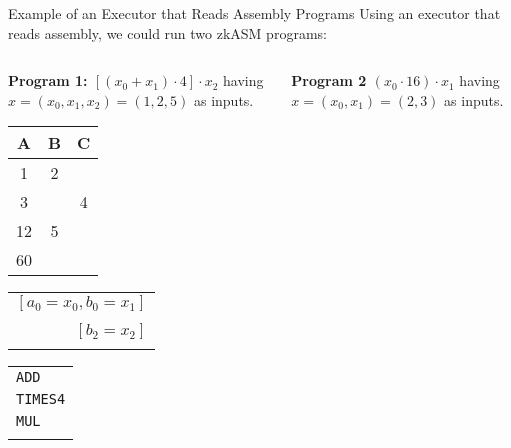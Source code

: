 \begin{frame} {Example of an Executor that Reads Assembly Programs}
\large
Using an executor that reads assembly, we could run two zkASM programs:
\normalsize
~\\
\begin{columns}
\begin{column}{0.55\textwidth}
\textbf{Program 1: $[(x_0+x_1)\cdot4]\cdot x_2$} having $x=(x_0, x_1, x_2)=(1,2,5)$ as inputs.

\vspace{1em}

\begin{table}[h!]
\centering

\begin{tabular}{|c|c|c|}
\hline
\textbf{A} & \textbf{B} & \cellcolor{lightgray} \textbf{C} \\ \hline
1 & 2 & \cellcolor{lightgray} \\ \hline
3 & & \cellcolor{lightgray} 4 \\ \hline
12 & 5 & \cellcolor{lightgray} \\ \hline
60 & & \cellcolor{lightgray} \\ \hline
\end{tabular}
\hspace{1mm}
\begin{tabular}{r}
                    \\
$[a_0=x_0, b_0=x_1]$  \\
                    \\
$[b_2 = x_2]$         \\
                    \\

\end{tabular}
\hspace{1em}
\begin{tabular}{l}
                    \\
\texttt{ADD} \\
\texttt{TIMES4} \\
\texttt{MUL} \\
\\
\end{tabular}
\end{table}
\end{column}
\begin{column}{0.45\textwidth}
\textbf{Program 2 $(x_0\cdot16)\cdot x_1$} having $x=(x_0, x_1)=(2, 3)$ as inputs.

\vspace{1em}


\end{column}
\end{columns}
\end{frame}
